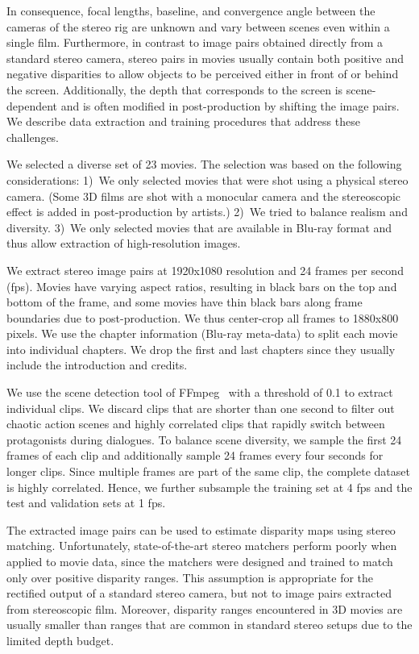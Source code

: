 In consequence, focal lengths, baseline, and convergence angle between the cameras of the stereo rig are unknown and vary between scenes even within a single film. Furthermore, in contrast to image pairs obtained directly from a standard stereo camera, stereo pairs in movies usually contain both positive and negative disparities to allow objects to be perceived either in front of or behind the screen. Additionally, the depth that corresponds to the screen is scene-dependent and is often modified in post-production by shifting the image pairs. We describe data extraction and training procedures that address these challenges.

 We selected a diverse set of 23 movies. The selection was based on the following considerations: 1)~We only selected movies that were shot using a physical stereo camera. (Some 3D films are shot with a monocular camera and the stereoscopic effect is added in post-production by artists.) 2)~We tried to balance realism and diversity. 3)~We only selected movies that are available in Blu-ray format and thus allow extraction of high-resolution images.

We extract stereo image pairs at 1920x1080 resolution and 24 frames per second (fps). Movies have varying aspect ratios, resulting in black bars on the top and bottom of the frame, and some movies have thin black bars along frame boundaries due to post-production. We thus center-crop all frames to 1880x800 pixels. We use the chapter information (Blu-ray meta-data) to split each movie into individual chapters. We drop the first and last chapters since they usually include the introduction and credits.

We use the scene detection tool of FFmpeg~\cite{ffmpeg2018} with a threshold of 0.1 to extract individual clips. We discard clips that are shorter than one second to filter out chaotic action scenes and highly correlated clips that rapidly switch between protagonists during dialogues. To balance scene diversity, we sample the first 24 frames of each clip and additionally sample 24 frames every four seconds for longer clips. Since multiple frames are part of the same clip, the complete dataset is highly correlated. Hence, we further subsample the training set at 4 fps and the test and validation sets at 1 fps.

 The extracted image pairs can be used to estimate disparity maps using stereo matching. Unfortunately, state-of-the-art stereo matchers perform poorly when applied to movie data, since the matchers were designed and trained to match only over positive disparity ranges. This assumption is appropriate for the rectified output of a standard stereo camera, but not to image pairs extracted from stereoscopic film. Moreover, disparity ranges encountered in 3D movies are usually smaller than ranges that are common in standard stereo setups due to the limited depth budget.

